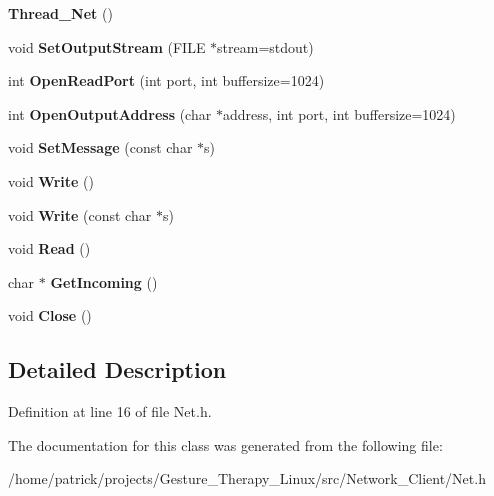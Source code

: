 \begin{DoxyCompactItemize}
\item 
\mbox{\label{class_net_af053404e61088796461ebbcb4968f3ef}} 
{\bfseries Thread\+\_\+\+Net} ()
\item 
\mbox{\label{class_net_a65003aa79c9b476e5e8f30899c1068b2}} 
void {\bfseries Set\+Output\+Stream} (F\+I\+LE $\ast$stream=stdout)
\item 
\mbox{\label{class_net_ae392ea2a9a6d616e25f72e23e13aa22b}} 
int {\bfseries Open\+Read\+Port} (int port, int buffersize=1024)
\item 
\mbox{\label{class_net_a442c203c3f075ccf396f54203b52d772}} 
int {\bfseries Open\+Output\+Address} (char $\ast$address, int port, int buffersize=1024)
\item 
\mbox{\label{class_net_ac0b75d4c0accf0d7cda1ea787129406d}} 
void {\bfseries Set\+Message} (const char $\ast$s)
\item 
\mbox{\label{class_net_a7ca78732d53f14bc73550797cc4dc972}} 
void {\bfseries Write} ()
\item 
\mbox{\label{class_net_a53a9811198455aea45c128f2cc37808b}} 
void {\bfseries Write} (const char $\ast$s)
\item 
\mbox{\label{class_net_a9f291ebfa435c730e38aa8ddf8de8ffb}} 
void {\bfseries Read} ()
\item 
\mbox{\label{class_net_a2dc15da019d5c02be4ed2ef479218811}} 
char $\ast$ {\bfseries Get\+Incoming} ()
\item 
\mbox{\label{class_net_a49253c1c086a854f3ed685b23b8b1d34}} 
void {\bfseries Close} ()
\end{DoxyCompactItemize}


\subsection{Detailed Description}


Definition at line 16 of file Net.\+h.



The documentation for this class was generated from the following file\+:\begin{DoxyCompactItemize}
\item 
/home/patrick/projects/\+Gesture\+\_\+\+Therapy\+\_\+\+Linux/src/\+Network\+\_\+\+Client/Net.\+h\end{DoxyCompactItemize}
